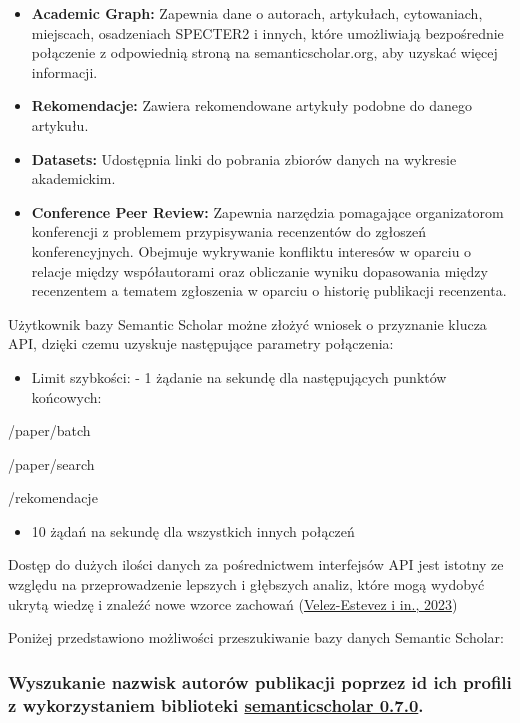 \documentclass[
  12pt,
]{article}
\providecommand{\tightlist}{%
  \setlength{\itemsep}{0pt}\setlength{\parskip}{0pt}}
\begin{document}
\begin{itemize}
\item
  \textbf{Academic Graph:} Zapewnia dane o autorach, artykułach,
  cytowaniach, miejscach, osadzeniach SPECTER2 i innych, które
  umożliwiają bezpośrednie połączenie z odpowiednią stroną na
  semanticscholar.org, aby uzyskać więcej informacji.
\item
  \textbf{Rekomendacje:} Zawiera rekomendowane artykuły podobne do
  danego artykułu.
\item
  \textbf{Datasets:} Udostępnia linki do pobrania zbiorów danych na
  wykresie akademickim.
\item
  \textbf{Conference Peer Review:} Zapewnia narzędzia pomagające
  organizatorom konferencji z problemem przypisywania recenzentów do
  zgłoszeń konferencyjnych. Obejmuje wykrywanie konfliktu interesów w
  oparciu o relacje między współautorami oraz obliczanie wyniku
  dopasowania między recenzentem a tematem zgłoszenia w oparciu o
  historię publikacji recenzenta.
\end{itemize}

Użytkownik bazy Semantic Scholar możne złożyć wniosek o przyznanie
klucza API, dzięki czemu uzyskuje następujące parametry połączenia:

\begin{itemize}
\tightlist
\item
  Limit szybkości: - 1 żądanie na sekundę dla następujących punktów
  końcowych:
\end{itemize}

/paper/batch

/paper/search

/rekomendacje

\begin{itemize}
\tightlist
\item
  10 żądań na sekundę dla wszystkich innych połączeń
\end{itemize}

Dostęp do dużych ilości danych za pośrednictwem interfejsów API jest
istotny ze względu na przeprowadzenie lepszych i głębszych analiz, które
mogą wydobyć ukrytą wiedzę i znaleźć nowe wzorce zachowań
(\protect\hyperlink{ref-velez-estevez2023}{Velez-Estevez i in., 2023})

Poniżej przedstawiono możliwości przeszukiwanie bazy danych Semantic
Scholar:

\hypertarget{wyszukanie-nazwisk-autoruxf3w-publikacji-poprzez-id-ich-profili-z-wykorzystaniem-biblioteki-semanticscholar-0.7.0.}{%
\subsubsection{\texorpdfstring{Wyszukanie nazwisk autorów publikacji
poprzez id ich profili z wykorzystaniem biblioteki
\href{https://pypi.org/project/semanticscholar}{semanticscholar
0.7.0}.}{Wyszukanie nazwisk autorów publikacji poprzez id ich profili z wykorzystaniem biblioteki semanticscholar 0.7.0.}}\label{wyszukanie-nazwisk-autoruxf3w-publikacji-poprzez-id-ich-profili-z-wykorzystaniem-biblioteki-semanticscholar-0.7.0.}}
\end{document}
